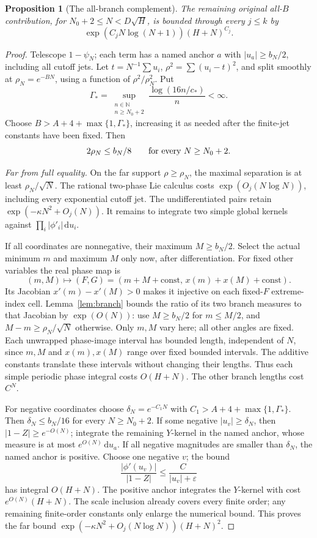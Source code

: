 \documentclass[11pt]{article}
\numberwithin{equation}{section}
\newtheorem{proposition}[theorem]{Proposition}
\theoremstyle{definition}
\newcommand{\dd}{\,\mathrm d}
\newcommand{\eps}{\varepsilon}
\begin{document}
\begin{proposition}[The all-branch complement]\label{prop:allB}
The remaining original all-\(B\) contribution, for
\(N_0+2\le N<D\sqrt H\), is bounded through every \(j\le k\) by
\[
 \exp(C_jN\log(N+1))(H+N)^{C_j}.
\]
\end{proposition}
\begin{proof}
Telescope \(1-\psi_N\); each term has a named anchor \(a\) with
\(|u_a|\ge b_N/2\), including all cutoff jets.
Let \(t=N^{-1}\sum u_i\), \(\rho^2=\sum(u_i-t)^2\), and split
smoothly at \(\rho_N=e^{-BN}\), using a function of
\(\rho^2/\rho_N^2\). Put
\[
 \Gamma_* = \sup_{\substack{n\in\mathbb N\\n\ge N_0+2}}
                   \frac{\log(16n/c_*)}{n}<\infty.
\]
Choose \(B>A+4+\max\{1,\Gamma_*\}\), increasing it as needed
after the finite-jet constants have been fixed. Then
\[
 2\rho_N\le b_N/8\qquad\hbox{for every }N\ge N_0+2.
\]

\smallskip\noindent\textit{Far from full equality.}
On the far support \(\rho\ge\rho_N\), the maximal separation
is at least \(\rho_N/\sqrt N\). The rational two-phase Lie
calculus costs \(\exp(O_j(N\log N))\), including every exponential
cutoff jet. The undifferentiated pairs retain
\(\exp(-\kappa N^2+O_j(N))\).
It remains to integrate two simple global kernels against
\(\prod_i|\phi'_i|\dd u_i\).

If all coordinates are nonnegative, their maximum \(M\ge b_N/2\).
Select the actual minimum \(m\) and maximum \(M\) only now,
after differentiation. For fixed other variables the real phase
map is
\[
 (m,M)\longmapsto(F,G)
    =(m+M+\mathrm{const},\,x(m)+x(M)+\mathrm{const}).
\]
Its Jacobian \(x'(m)-x'(M)>0\) makes it injective on each fixed-\(F\)
extreme-index cell. Lemma~\ref{lem:branch} bounds the ratio of its
two branch measures to that Jacobian by \(\exp(O(N))\):
use \(M\ge b_N/2\) for \(m\le M/2\), and
\(M-m\ge\rho_N/\sqrt N\) otherwise.
Only \(m,M\) vary here; all other angles are fixed. Each unwrapped
phase-image interval has bounded length, independent of \(N\), since
\(m,M\) and \(x(m),x(M)\) range over fixed bounded intervals.
The additive constants translate these intervals without changing
their lengths. Thus each simple periodic phase integral costs
\(O(H+N)\). The other branch lengths cost \(C^N\).

For negative coordinates choose \(\delta_N=e^{-C_1N}\) with
\(C_1>A+4+\max\{1,\Gamma_*\}\). Then \(\delta_N\le b_N/16\)
for every \(N\ge N_0+2\). If some negative \(|u_v|\ge\delta_N\), then
\(|1-Z|\ge e^{-O(N)}\); integrate the remaining \(Y\)-kernel
in the named anchor, whose measure is at most \(e^{O(N)}\dd u_a\).
If all negative magnitudes are smaller than \(\delta_N\), the
named anchor is positive. Choose one negative \(v\); the bound
\[
 \frac{|\phi'(u_v)|}{|1-Z|}\le\frac C{|u_v|+\eps}
\]
has integral \(O(H+N)\). The positive anchor integrates the
\(Y\)-kernel with cost \(e^{O(N)}(H+N)\).
The scale inclusion already covers every finite order; any
remaining finite-order constants only enlarge the numerical bound.
This proves the far bound
\(\exp(-\kappa N^2+O_j(N\log N))(H+N)^2\).


\end{proof}
\end{document}
